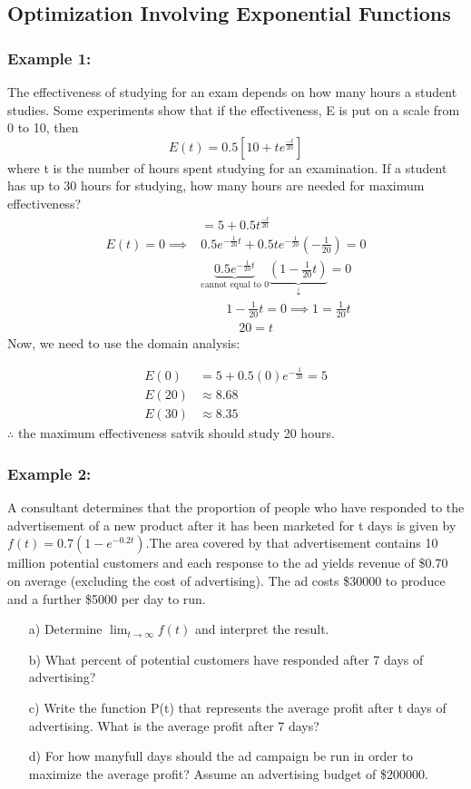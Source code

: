 \documentclass{article}
\begin{document}
\subsection{Optimization Involving Exponential Functions}
\subsubsection*{Example 1:}
The effectiveness of studying for an exam depends on how many hours a student studies. Some experiments show that if the effectiveness, E is put on a scale from 0 to 10, then
$$E(t)=0.5\left[10+te^{\frac{-t}{20}}\right]$$
where t is the number of hours spent studying for an examination. If a student has up to 30 hours for studying, how many hours are needed for maximum effectiveness?
\begin{align*}
    &=5+0.5t^{\frac{-t}{20}}\\
    E(t)=0 \implies & 0.5e^{-\frac{1}{20}t}+0.5te^{-\frac{1}{20}} \left(-\frac{1}{20}\right)=0\\
    &\underbrace{0.5e^{-\frac{1}{20}t}}_{\text{cannot equal to 0}} \underbrace{\left(1-\frac{1}{20}t\right)}_{\downarrow }=0\\
    &\quad \quad 1-\frac{1}{20}t=0 \implies 1=\frac{1}{20}t\\
    &\quad \quad \quad 20=t
\end{align*}
Now, we need to use the domain analysis:

\begin{align*}
    E(0)&=5+0.5(0)e^{-\frac{1}{20}}=5\\
    E(20)&\approx8.68\\
    E(30)&\approx8.35
\end{align*}
$\therefore$ the maximum effectiveness satvik should study 20 hours.
\newpage 

\subsubsection*{Example 2:}
A consultant determines that the proportion of people who have responded to the advertisement of a new product after it has been marketed for t days is given by $f(t)=0.7(1-e^{-0.2t})$.The area covered by that advertisement contains 10 million potential customers and each response to the ad yields revenue of \$0.70 on average (excluding the cost of advertising). The ad costs \$30000 to produce and a further \$5000 per day to run.

\begin{enumerate}
    \item[a)] Determine $\lim_{t\to\infty}f(t)$ and interpret the result.
    \item[b)] What percent of potential customers have responded after 7 days of advertising?
    \item[c)] Write the function P(t) that represents the average profit after t days of advertising. What is the average profit after 7 days?
    \item[d)] For how manyfull days should the ad campaign be run in order to maximize the average profit? Assume an advertising budget of \$200000.
\end{enumerate}
\end{document}
